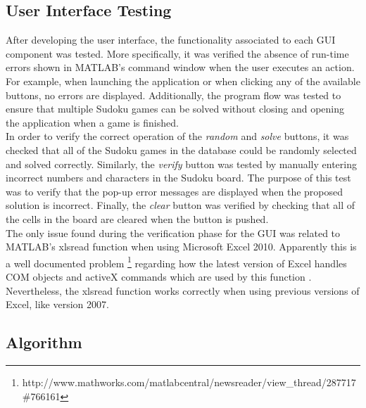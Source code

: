 \documentclass[12pt,a4paper]{article} %
\begin{document}
\subsection{User Interface Testing}
After developing the user interface, the functionality associated to each GUI component was tested. More specifically, it was verified the absence of run-time errors shown in MATLAB’s command window when the user executes an action. For example, when launching the application or when clicking any of the available buttons, no errors are displayed. Additionally, the program flow was tested to ensure that multiple Sudoku games can be solved without closing and opening the application when a game is finished.
\newline
\\In order to verify the correct operation of the \textit{random} and \textit{solve} buttons, it was checked that all of the Sudoku games in the database could be randomly selected and solved correctly. Similarly, the \textit{verify} button was tested by manually entering incorrect numbers and characters in the Sudoku board. The purpose of this test was to verify that the pop-up error messages are displayed when the proposed solution is incorrect. Finally, the \textit{clear} button was verified by checking that all of the cells in the board are cleared when the button is pushed.
\newline
\\The only issue found during the verification phase for the GUI was related to MATLAB’s xlsread function when using Microsoft Excel 2010. Apparently this is a well documented problem \footnote{http://www.mathworks.com/matlabcentral/newsreader/view\_thread/287717\#766161} regarding how the latest version of Excel handles COM objects and activeX commands which are used by this function . Nevertheless, the xlsread function works correctly when using previous versions of Excel, like version 2007. 

\subsection{Algorithm}
\end{document}
